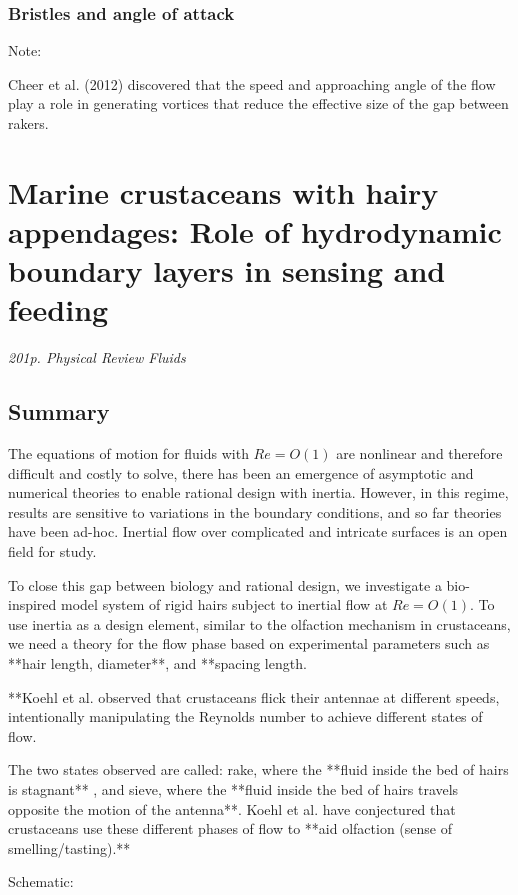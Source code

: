 \documentclass[preprint, letterpaper, nobibnotes, aps, superscriptaddress,prb]{revtex4-1}
\begin{document}
\subsubsection{Bristles and angle of attack}

Note:

 Cheer et al. (2012) discovered that the speed and approaching angle of the flow play a role in generating vortices that reduce the effective size of the gap between rakers.

\clearpage

\section{Marine crustaceans with hairy appendages: Role of hydrodynamic boundary layers in sensing and feeding}

\textit{201p. Physical Review Fluids}
\subsection{Summary}
    
The equations of motion for fluids with $Re = O(1)$ are nonlinear and therefore difficult and costly to solve, there has been an emergence of asymptotic and numerical theories to enable rational design with inertia. However, in this regime, results are sensitive to variations in the boundary conditions, and so far theories have been ad-hoc. Inertial flow over complicated and intricate surfaces is an open field for study.

To close this gap between biology and rational design, we investigate a bio-inspired model system of rigid hairs subject to inertial flow at $Re = O(1)$. To use inertia as a design element, similar to the olfaction mechanism in crustaceans, we need a theory for the flow phase based on experimental parameters such as **hair length, diameter**, and **spacing length.

**Koehl et al. observed that crustaceans flick their antennae at different speeds, intentionally manipulating the Reynolds number to achieve different states of flow. 

The two states observed are called:
rake, where the **fluid inside the bed of hairs is stagnant**
, and 
sieve, where the **fluid inside the bed of hairs travels opposite the motion of the antenna**. Koehl et al. have conjectured that crustaceans use these different phases of flow to **aid olfaction (sense of smelling/tasting).**

Schematic:
\begin{figure}[H]
  \centering {}
  \caption{}\label{fig2}
\end{figure}
\end{document}
